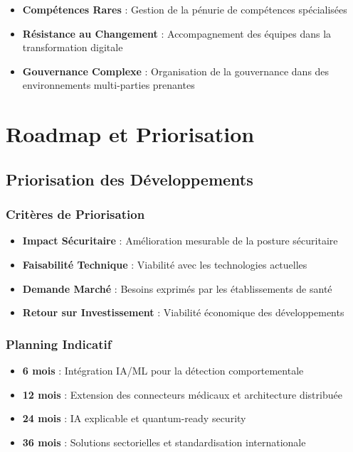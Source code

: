 \begin{itemize}
    \item \textbf{Compétences Rares} : Gestion de la pénurie de compétences spécialisées
    \item \textbf{Résistance au Changement} : Accompagnement des équipes dans la transformation digitale
    \item \textbf{Gouvernance Complexe} : Organisation de la gouvernance dans des environnements multi-parties prenantes
\end{itemize}

\section{Roadmap et Priorisation}

\subsection{Priorisation des Développements}

\subsubsection{Critères de Priorisation}

\begin{itemize}
    \item \textbf{Impact Sécuritaire} : Amélioration mesurable de la posture sécuritaire
    \item \textbf{Faisabilité Technique} : Viabilité avec les technologies actuelles
    \item \textbf{Demande Marché} : Besoins exprimés par les établissements de santé
    \item \textbf{Retour sur Investissement} : Viabilité économique des développements
\end{itemize}

\subsubsection{Planning Indicatif}

\begin{itemize}
    \item \textbf{6 mois} : Intégration IA/ML pour la détection comportementale
    \item \textbf{12 mois} : Extension des connecteurs médicaux et architecture distribuée
    \item \textbf{24 mois} : IA explicable et quantum-ready security
    \item \textbf{36 mois} : Solutions sectorielles et standardisation internationale
\end{itemize}


